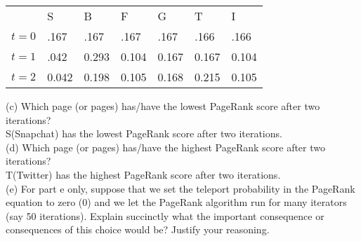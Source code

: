 \documentclass{article}
\begin{document}
\begin{table}[h!]
	\begin{tabular}{lllllll}
		& S     & B     & F     & G     & T     & I     \\
		$t=0$ & .167 & .167  & .167  & .167  & .166  & .166  \\
		$t=1$ & .042 & 0.293 & 0.104 & 0.167 & 0.167 & 0.104  \\
		$t=2$ & 0.042 &  0.198 &  0.105 & 0.168 & 0.215 & 0.105
	\end{tabular}
\end{table}

\noindent
(c) Which page (or pages) has/have the lowest PageRank score after two iterations? \\
S(Snapchat) has the lowest PageRank score after two iterations.\\


\noindent
(d) Which page (or pages) has/have the highest PageRank score after two iterations?\\
T(Twitter) has the highest PageRank score after two iterations. \\

\noindent
(e) For part e only, suppose that we set the teleport probability in the PageRank equation to zero (0)
and we let the PageRank algorithm run for many iterators (say 50 iterations). Explain succinctly what the
important consequence or consequences of this choice would be? Justify your reasoning.
\end{document}
